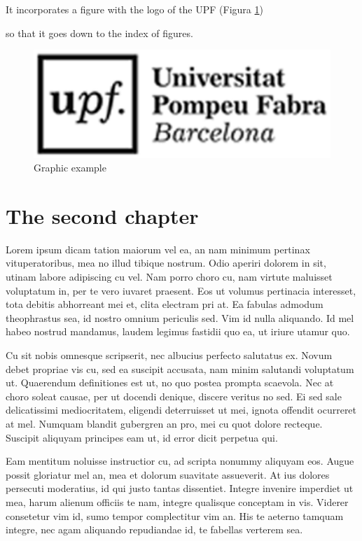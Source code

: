 \documentclass[12pt, b5paper,twoside]{tesi_upf}
\begin{document}
It incorporates a figure with the logo of the UPF (Figura \ref{fig:logo}) {so that it goes down to the index of figures.
\begin{figure}[h]
  \centering
  \includegraphics[scale=0.5]{logo_upf.png}
    \caption{Graphic example}
    \label{fig:logo}
\end{figure}


\chapter{The second chapter}

Lorem ipsum dicam tation maiorum vel ea, an nam minimum pertinax vituperatoribus, mea no illud tibique nostrum. Odio aperiri dolorem in sit, utinam labore adipiscing cu vel. Nam porro choro cu, nam virtute maluisset voluptatum in, per te vero iuvaret praesent. Eos ut volumus pertinacia interesset, tota debitis abhorreant mei et, clita electram pri at. Ea fabulas admodum theophrastus sea, id nostro omnium periculis sed. Vim id nulla aliquando. Id mel habeo nostrud mandamus, laudem legimus fastidii quo ea, ut iriure utamur quo.

Cu sit nobis omnesque scripserit, nec albucius perfecto salutatus ex. Novum debet propriae vis cu, sed ea suscipit accusata, nam minim salutandi voluptatum ut. Quaerendum definitiones est ut, no quo postea prompta scaevola. Nec at choro soleat causae, per ut docendi denique, discere veritus no sed. Ei sed sale delicatissimi mediocritatem, eligendi deterruisset ut mei, ignota offendit ocurreret at mel. Numquam blandit gubergren an pro, mei cu quot dolore recteque. Suscipit aliquyam principes eam ut, id error dicit perpetua qui.

Eam mentitum noluisse instructior cu, ad scripta nonummy aliquyam eos. Augue possit gloriatur mel an, mea et dolorum suavitate assueverit. At ius dolores persecuti moderatius, id qui justo tantas dissentiet. Integre invenire imperdiet ut mea, harum alienum officiis te nam, integre qualisque conceptam in vis. Viderer consetetur vim id, sumo tempor complectitur vim an. His te aeterno tamquam integre, nec agam aliquando repudiandae id, te fabellas verterem sea.

}
\end{document}
